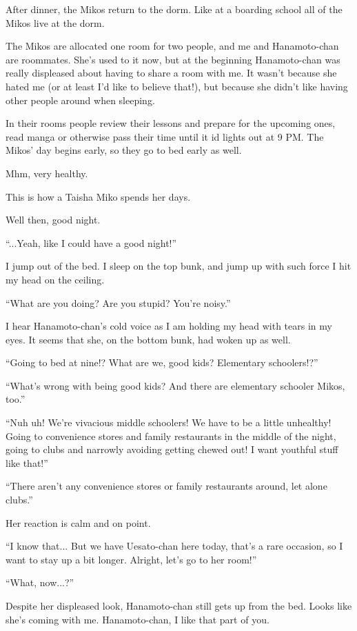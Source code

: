 After dinner, the Mikos return to the dorm. Like at a boarding school all of the Mikos live at the dorm.

The Mikos are allocated one room for two people, and me and Hanamoto-chan are roommates. She's used to it now, but at the beginning Hanamoto-chan was really displeased about having to share a room with me. It wasn't because she hated me (or at least I'd like to believe that!), but because she didn't like having other people around when sleeping.

In their rooms people review their lessons and prepare for the upcoming ones, read manga or otherwise pass their time until it id lights out at 9 PM. The Mikos' day begins early, so they go to bed early as well.

Mhm, very healthy.

This is how a Taisha Miko spends her days.

Well then, good night.

``...Yeah, like I could have a good night!''

I jump out of the bed. I sleep on the top bunk, and jump up with such force I hit my head on the ceiling.

``What are you doing? Are you stupid? You're noisy.''

I hear Hanamoto-chan's cold voice as I am holding my head with tears in my eyes. It seems that she, on the bottom bunk, had woken up as well.

``Going to bed at nine!? What are we, good kids? Elementary schoolers!?''

``What's wrong with being good kids? And there are elementary schooler Mikos, too.''

``Nuh uh! We're vivacious middle schoolers! We have to be a little unhealthy! Going to convenience stores and family restaurants in the middle of the night, going to clubs and narrowly avoiding getting chewed out! I want youthful stuff like that!''

``There aren't any convenience stores or family restaurants around, let alone clubs.''

Her reaction is calm and on point.

``I know that... But we have Uesato-chan here today, that's a rare occasion, so I want to stay up a bit longer. Alright, let's go to her room!''

``What, now...?''

Despite her displeased look, Hanamoto-chan still gets up from the bed. Looks like she's coming with me. Hanamoto-chan, I like that part of you.

